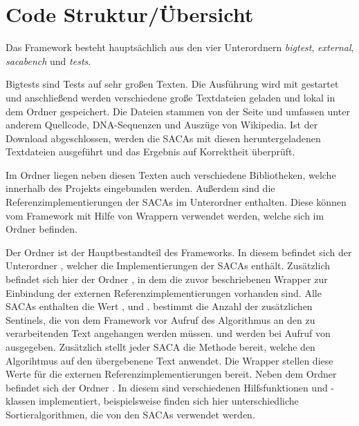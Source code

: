 \section{Code Struktur/Übersicht}
\label{sec:code-structure}
Das  Framework besteht hauptsächlich aus den vier Unterordnern \textit{bigtest}, \textit{external}, \textit{sacabench} und \textit{tests}. \par
Bigtests sind Tests auf sehr großen Texten.
Die Ausführung wird mit  gestartet und anschließend werden verschiedene große Textdateien geladen und lokal in dem Ordner  gespeichert. 
Die Dateien stammen von der Seite  und umfassen unter anderem Quellcode, DNA-Sequenzen und Auszüge von Wikipedia.
Ist der Download abgeschlossen, werden die SACAs mit diesen heruntergeladenen Textdateien ausgeführt und das Ergebnis auf Korrektheit überprüft. \par
Im Ordner  liegen neben diesen Texten auch verschiedene Bibliotheken, welche innerhalb des Projekts eingebunden werden.
Außerdem sind die Referenzimplementierungen der SACAs im Unterordner  enthalten. 
Diese können vom Framework mit Hilfe von Wrappern verwendet werden, welche sich im Ordner  befinden. \par
Der Ordner  ist der Hauptbestandteil des Frameworks. 
In diesem befindet sich der Unterordner , welcher die Implementierungen der SACAs enthält. 
Zusätzlich befindet sich hier der Ordner , in dem die zuvor beschriebenen Wrapper zur Einbindung der externen Referenzimplementierungen vorhanden sind. 
Alle SACAs enthalten die Wert ,  und . 
 bestimmt die Anzahl der zusätzlichen Sentinels, die von dem Framework vor Aufruf des Algorithmus an den zu verarbeitenden Text angehangen werden müssen. 
 und  werden bei Aufruf von  ausgegeben. 
Zusätzlich stellt jeder SACA die Methode  bereit, welche den Algorihtmus auf den übergebenene Text anwendet. 
Die Wrapper stellen diese Werte für die externen Referenzimplementierungen bereit.
Neben dem Ordner  befindet sich der Ordner . 
In diesem sind verschiedenen Hilfsfunktionen und -klassen implementiert, beispielsweise finden sich hier unterschiedliche Sortieralgorithmen, die von den SACAs verwendet werden. 
